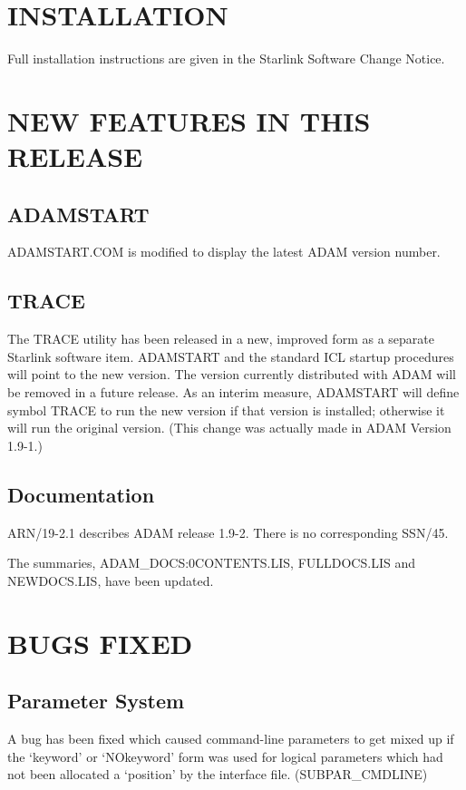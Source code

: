 \section{INSTALLATION}
Full installation instructions are given in the Starlink Software 
Change Notice.

\section{NEW FEATURES IN THIS RELEASE}

\subsection{ADAMSTART}
ADAMSTART.COM is modified to display the latest ADAM version number.

\subsection{TRACE}
The TRACE utility has been released in a new, improved form as
a separate Starlink software item.
ADAMSTART and the standard ICL startup procedures will point to the new 
version.
The version currently distributed with ADAM will be removed in a future
release.
As an interim measure, ADAMSTART will define symbol TRACE to run the new version
if that version is installed; otherwise it will run the original version.
(This change was actually made in ADAM Version 1.9-1.)

\subsection{Documentation}
ARN/19-2.1 describes ADAM release 1.9-2.
There is no corresponding SSN/45.

The summaries, ADAM\_DOCS:0CONTENTS.LIS, FULLDOCS.LIS and NEWDOCS.LIS, have 
been updated. 

\section{BUGS FIXED}

\subsection{Parameter System}
A bug has been fixed which caused command-line parameters to get mixed up if 
the `keyword' or `NOkeyword' form was used for logical parameters which had not
been allocated a `position' by the interface file.
(SUB\-PAR\_\-CMD\-LINE) 

